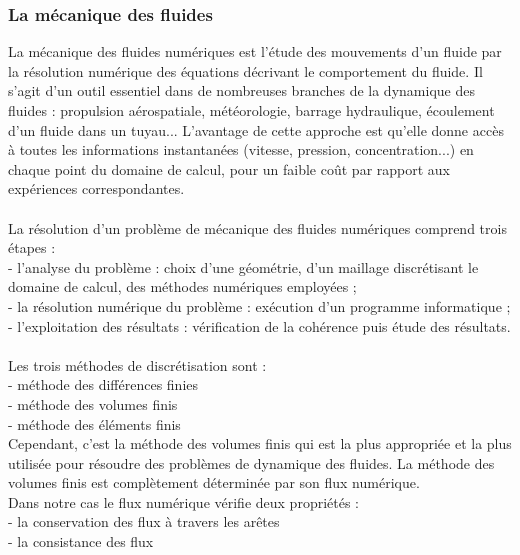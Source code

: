 \documentclass[12pt]{article}
\begin{document}
\subsubsection{La mécanique des fluides}
\noindent La mécanique des fluides numériques est l'étude des mouvements d'un fluide par la résolution numérique des équations décrivant le comportement du fluide. Il s'agit d'un outil essentiel dans de nombreuses branches de la dynamique des fluides : propulsion aérospatiale, météorologie, barrage hydraulique, écoulement d'un fluide dans un tuyau... L'avantage de cette approche est qu'elle donne accès à toutes les informations instantanées (vitesse, pression, concentration...) en chaque point du domaine de calcul, pour un faible coût par rapport aux expériences correspondantes. 
\\
\\La résolution d'un problème de mécanique des fluides numériques comprend trois étapes :
\\- l'analyse du problème : choix d'une géométrie, d'un maillage discrétisant le domaine de calcul, des méthodes numériques employées ;
\\- la résolution numérique du problème : exécution d'un programme informatique ;
\\- l'exploitation des résultats : vérification de la cohérence puis étude des résultats.
\\
\\Les trois méthodes de discrétisation sont :
\\- méthode des différences finies
\\- méthode des volumes finis
\\- méthode des éléments finis
\\Cependant, c'est la méthode des volumes finis qui est la plus appropriée et la plus utilisée pour résoudre des problèmes de dynamique des fluides.
La méthode des volumes finis est complètement déterminée par son flux numérique.
\\

\noindent Dans notre cas le flux numérique vérifie deux propriétés :
\\- la conservation des flux à travers les arêtes
\\ - la consistance des flux
\\
\end{document}
